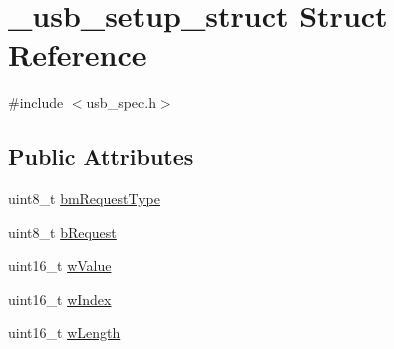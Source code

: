 \hypertarget{struct__usb__setup__struct}{\section{\-\_\-usb\-\_\-setup\-\_\-struct Struct Reference}
\label{struct__usb__setup__struct}
}


{\ttfamily \#include $<$usb\-\_\-spec.\-h$>$}

\subsection*{Public Attributes}
\begin{DoxyCompactItemize}
\item 
uint8\-\_\-t \hyperlink{struct__usb__setup__struct_a046235551b5e7ed60f883c8787e41cda}{bm\-Request\-Type}
\item 
uint8\-\_\-t \hyperlink{struct__usb__setup__struct_ab42c93dd57c8237b0375d5f2d318048c}{b\-Request}
\item 
uint16\-\_\-t \hyperlink{struct__usb__setup__struct_af9854cf49281f21bd5371e2c77b97b90}{w\-Value}
\item 
uint16\-\_\-t \hyperlink{struct__usb__setup__struct_a90bd23714ef7a57ef8a1bda38f2f26cf}{w\-Index}
\item 
uint16\-\_\-t \hyperlink{struct__usb__setup__struct_ac94c97a6091feb75aee54a7b0906b138}{w\-Length}
\end{DoxyCompactItemize}


